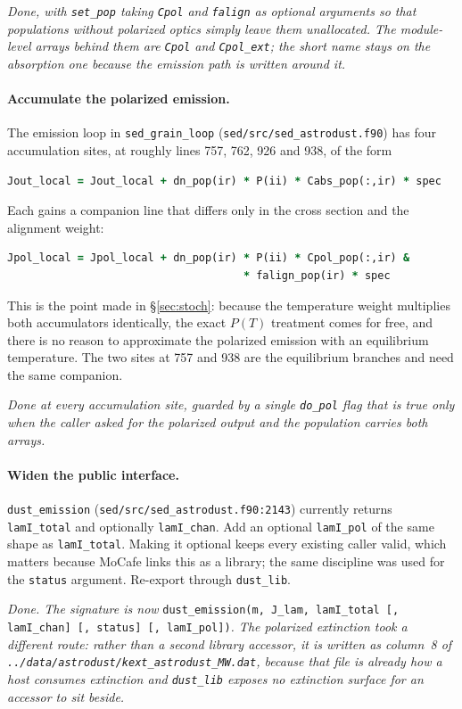 \documentclass{my_memo}
\newcommand{\code}[1]{\texttt{#1}}
\begin{document}
\emph{Done, with \code{set\_pop} taking \code{Cpol} and \code{falign} as
optional arguments so that populations without polarized optics simply
leave them unallocated. The module-level arrays behind them are
\code{Cpol} and \code{Cpol\_ext}; the short name stays on the absorption
one because the emission path is written around it.}

\paragraph{Accumulate the polarized emission.} The emission loop in
\code{sed\_grain\_loop} (\code{sed/src/sed\_astrodust.f90}) has four
accumulation sites, at roughly lines 757, 762, 926 and 938, of the form
%
\begin{lstlisting}[language=Fortran]
Jout_local = Jout_local + dn_pop(ir) * P(ii) * Cabs_pop(:,ir) * spec
\end{lstlisting}
%
Each gains a companion line that differs only in the cross section and
the alignment weight:
%
\begin{lstlisting}[language=Fortran]
Jpol_local = Jpol_local + dn_pop(ir) * P(ii) * Cpol_pop(:,ir) &
                                     * falign_pop(ir) * spec
\end{lstlisting}
%
This is the point made in \S\ref{sec:stoch}: because the temperature
weight multiplies both accumulators identically, the exact $P(T)$
treatment comes for free, and there is no reason to approximate the
polarized emission with an equilibrium temperature. The two sites at 757
and 938 are the equilibrium branches and need the same companion.

\emph{Done at every accumulation site, guarded by a single \code{do\_pol}
flag that is true only when the caller asked for the polarized output and
the population carries both arrays.}

\paragraph{Widen the public interface.} \code{dust\_emission}
(\code{sed/src/sed\_astrodust.f90:2143}) currently returns
\code{lamI\_total} and optionally \code{lamI\_chan}. Add an optional
\code{lamI\_pol} of the same shape as \code{lamI\_total}. Making it
optional keeps every existing caller valid, which matters because
MoCafe links this as a library; the same discipline was used for the
\code{status} argument. Re-export through \code{dust\_lib}.

\emph{Done. The signature is now}
\code{dust\_emission(m, J\_lam, lamI\_total [, lamI\_chan] [, status]
[, lamI\_pol])}\emph{. The polarized \emph{extinction} took a different
route: rather than a second library accessor, it is written as column~8
of \code{../data/astrodust/kext\_astrodust\_MW.dat}, because that file is already
how a host consumes extinction and \code{dust\_lib} exposes no
extinction surface for an accessor to sit beside.}
\end{document}
